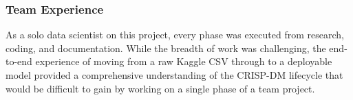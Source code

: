 \subsubsection{Team Experience}
\noindent
As a solo data scientist on this project, every phase was executed from research, coding, and documentation. While the breadth of work was challenging, the end-to-end experience of moving from a raw Kaggle CSV through to a deployable model provided a comprehensive understanding of the CRISP-DM lifecycle that would be difficult to gain by working on a single phase of a team project.

